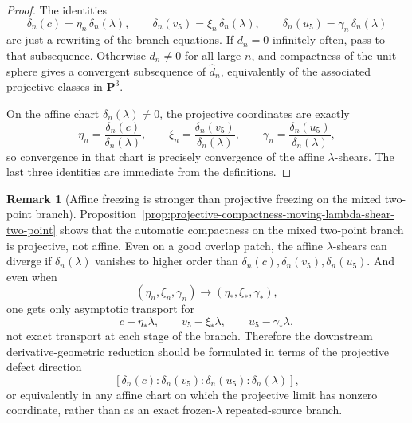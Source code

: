 \documentclass[11pt,a4paper]{amsart}
\theoremstyle{plain}
\theoremstyle{definition}
\newtheorem{remark}[theorem]{Remark}
\begin{document}
\begin{proof}
The identities
\[
\delta_n(c)=\eta_n\,\delta_n(\lambda),\qquad
\delta_n(v_5)=\xi_n\,\delta_n(\lambda),\qquad
\delta_n(u_5)=\gamma_n\,\delta_n(\lambda)
\]
are just a rewriting of the branch equations. If $d_n=0$ infinitely often, pass
to that subsequence. Otherwise $d_n\neq 0$ for all large $n$, and compactness of
the unit sphere gives a convergent subsequence of $\widehat d_n$, equivalently
of the associated projective classes in $\mathbf P^3$.

On the affine chart $\delta_n(\lambda)\neq 0$, the projective coordinates are
exactly
\[
\eta_n=\frac{\delta_n(c)}{\delta_n(\lambda)},\qquad
\xi_n=\frac{\delta_n(v_5)}{\delta_n(\lambda)},\qquad
\gamma_n=\frac{\delta_n(u_5)}{\delta_n(\lambda)},
\]
so convergence in that chart is precisely convergence of the affine
$\lambda$-shears. The last three identities are immediate from the definitions.
\end{proof}

\begin{remark}[Affine freezing is stronger than projective freezing on the mixed two-point branch]
\label{rem:affine-freezing-stronger-than-projective-two-point}
Proposition~\ref{prop:projective-compactness-moving-lambda-shear-two-point}
shows that the automatic compactness on the mixed two-point branch is
projective, not affine. Even on a good overlap patch, the affine
$\lambda$-shears can diverge if $\delta_n(\lambda)$ vanishes to higher order
than $\delta_n(c),\delta_n(v_5),\delta_n(u_5)$. And even when
\[
(\eta_n,\xi_n,\gamma_n)\to(\eta_*,\xi_*,\gamma_*),
\]
one gets only asymptotic transport for
\[
c-\eta_*\lambda,\qquad
v_5-\xi_*\lambda,\qquad
u_5-\gamma_*\lambda,
\]
not exact transport at each stage of the branch. Therefore the downstream
derivative-geometric reduction should be formulated in terms of the projective
defect direction
\[
[\delta_n(c):\delta_n(v_5):\delta_n(u_5):\delta_n(\lambda)],
\]
or equivalently in any affine chart on which the projective limit has nonzero
coordinate, rather than as an exact frozen-$\lambda$ repeated-source branch.
\end{remark}
\end{document}
